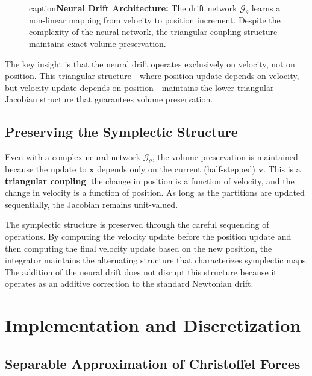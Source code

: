\documentclass[12pt,a4paper]{article}
\begin{document}
\begin{figure}[htbp]
\begin{tikzpicture}[scale=1.1]
\end{tikzpicture}
caption{\textbf{Neural Drift Architecture:} The drift network $\mathcal{G}_\theta$ 
         learns a non-linear mapping from velocity to position increment. 
         Despite the complexity of the neural network, the triangular 
         coupling structure maintains exact volume preservation.}
\label{fig:neural_drift}
\end{figure}

The key insight is that the neural drift operates exclusively on velocity, not on position. This triangular structure—where position update depends on velocity, but velocity update depends on position—maintains the lower-triangular Jacobian structure that guarantees volume preservation.

\subsection{Preserving the Symplectic Structure}

Even with a complex neural network $\mathcal{G}_\theta$, the volume preservation is maintained because the update to $\mathbf{x}$ depends only on the current (half-stepped) $\mathbf{v}$. This is a \textbf{triangular coupling}: the change in position is a function of velocity, and the change in velocity is a function of position. As long as the partitions are updated sequentially, the Jacobian remains unit-valued.

The symplectic structure is preserved through the careful sequencing of operations. By computing the velocity update before the position update and then computing the final velocity update based on the new position, the integrator maintains the alternating structure that characterizes symplectic maps. The addition of the neural drift does not disrupt this structure because it operates as an additive correction to the standard Newtonian drift.

\section{Implementation and Discretization}

\subsection{Separable Approximation of Christoffel Forces}
\end{document}

